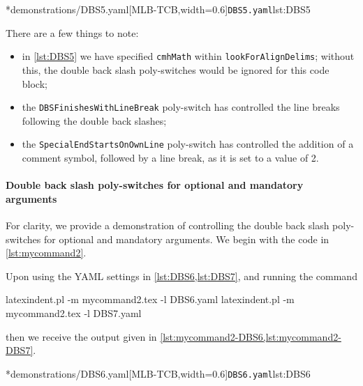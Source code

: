 		\begin{cmhtcbraster}[
				raster force size=false,
				raster column 1/.style={add to width=-.1\textwidth},
				raster column skip=.06\linewidth]
			\cmhlistingsfromfile[style=yaml-LST]*{demonstrations/DBS5.yaml}[MLB-TCB,width=0.6\textwidth]{\texttt{DBS5.yaml}}{lst:DBS5}
		\end{cmhtcbraster}

		There are a few things to note:
		\begin{itemize}
			\item in \cref{lst:DBS5} we have specified \texttt{cmhMath} within \texttt{lookForAlignDelims};
			      without this, the double back slash poly-switches would be ignored for this code block;
			\item the \texttt{DBSFinishesWithLineBreak} poly-switch has controlled the line breaks
			      following the double back slashes;
			\item the \texttt{SpecialEndStartsOnOwnLine} poly-switch has controlled the addition of a
			      comment symbol, followed by a line break, as it is set to a value of 2.
		\end{itemize}

	\paragraph{Double back slash poly-switches for optional and mandatory arguments}
		For clarity, we provide a demonstration of controlling the double back slash
		poly-switches for optional and mandatory arguments. We begin with the code in
		\cref{lst:mycommand2}.


		Upon using the YAML settings in \cref{lst:DBS6,lst:DBS7}, and running the command
		\begin{commandshell}
latexindent.pl -m mycommand2.tex -l DBS6.yaml
latexindent.pl -m mycommand2.tex -l DBS7.yaml
\end{commandshell}
		then we receive the output given in \cref{lst:mycommand2-DBS6,lst:mycommand2-DBS7}.

		\begin{cmhtcbraster}[
				raster force size=false,
				raster column 1/.style={add to width=-.1\textwidth},
				raster column skip=.03\linewidth]
			\cmhlistingsfromfile[style=yaml-LST]*{demonstrations/DBS6.yaml}[MLB-TCB,width=0.6\textwidth]{\texttt{DBS6.yaml}}{lst:DBS6}
		\end{cmhtcbraster}

